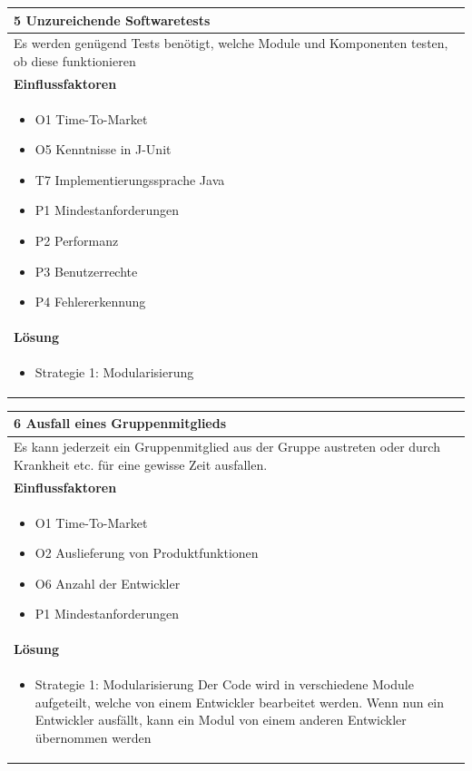 \documentclass[fontsize=12pt,paper=a4,twoside]{scrartcl}
\begin{document}
\begin{table}[H]
\begin{tabular}{|p{\textwidth}|}\hline
5 Unzureichende Softwaretests\\ \hline
Es werden genügend Tests benötigt, welche Module und Komponenten testen, ob diese funktionieren\\ \hline
\textbf{Einflussfaktoren}\\
\begin{itemize}
\item O1 Time-To-Market
\item O5 Kenntnisse in J-Unit
\item T7 Implementierungssprache Java
\item P1 Mindestanforderungen
\item P2 Performanz
\item P3 Benutzerrechte
\item P4 Fehlererkennung
\end{itemize}\\ \hline
\textbf{Lösung}\\
\begin{itemize}
\item Strategie 1: Modularisierung \leavevmode\newline
\end{itemize}\\ \hline
\end{tabular}
\end{table}

\begin{table}[H]
\begin{tabular}{|p{\textwidth}|}\hline
6 Ausfall eines Gruppenmitglieds\\ \hline
Es kann jederzeit ein Gruppenmitglied aus der Gruppe austreten oder durch Krankheit etc. für eine gewisse Zeit ausfallen.\\ \hline
\textbf{Einflussfaktoren}\\
\begin{itemize}
\item O1 Time-To-Market
\item O2 Auslieferung von Produktfunktionen
\item O6 Anzahl der Entwickler
\item P1 Mindestanforderungen
\end{itemize}\\ \hline
\textbf{Lösung}\\
\begin{itemize}
\item Strategie 1: Modularisierung \leavevmode\newline
Der Code wird in verschiedene Module aufgeteilt, welche von einem Entwickler bearbeitet werden. Wenn nun ein Entwickler ausfällt, kann ein Modul von einem anderen Entwickler übernommen werden
\end{itemize}\\ \hline
\end{tabular}
\end{table}
\end{document}
